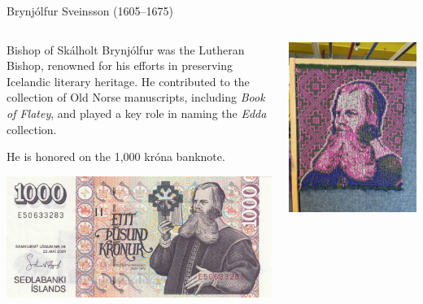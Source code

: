 \documentclass[
    NAME={Dr. Helga Ingimundardóttir},
    EMAIL={helgaingim@hi.is},
    FACULTY={Industrial Engineering},
    TITLE={HiDef Textiles: Reviving Tradition with Innovation},
    SUBTITLE={Empowering Creativity and Sustainability in Textile Production through Digital Transformation},
    SEMINAR={Reykjavík DataBeers},
    DATE={January 25, 2025},
    WIDE={true}
]{HI-LaTeX/hi-beamer}
\begin{document}
\begin{frame}{Brynjólfur Sveinsson (1605–1675)}
\begin{columns}
\begin{column}{.65\linewidth}
\begin{block}{Bishop of Skálholt}
Brynjólfur was the Lutheran Bishop, renowned for his efforts in preserving Icelandic literary heritage. He contributed to the collection of Old Norse manuscripts, including \emph{Book of Flatey}, and played a key role in naming the \emph{Edda} collection. 

He is honored on the 1,000 króna banknote.
\end{block}
    \centering 
    \includegraphics[width=.5\linewidth]{include/1000kr.JPG}
\end{column}
\begin{column}{.35\linewidth}
    \includegraphics[height=.75\textheight]{include/sveinsson.jpg}
\end{column}    


\end{columns}
\end{frame}
\end{document}
